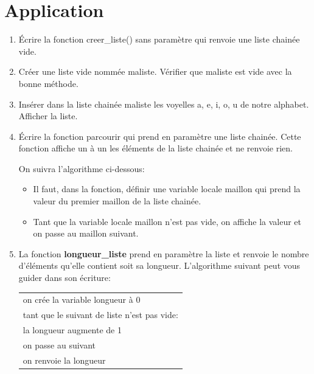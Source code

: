 \documentclass[11pt,a4paper]{article}
\begin{document}
\section{Application}


\begin{enumerate}
\setlength{\itemsep}{6pt}
\item Écrire la fonction \textsf{creer\_liste()} sans paramètre qui renvoie une liste chainée vide.

\item Créer une liste vide nommée \textsf{maliste}. Vérifier que \textsf{maliste} est vide avec la bonne méthode.

\item Insérer dans la liste chainée \textsf{maliste} les voyelles \textsf{a, e, i, o, u} de notre alphabet. Afficher la liste.

\item Écrire la fonction \textsf{parcourir} qui prend en paramètre une liste chainée. Cette fonction affiche un à un les éléments de la liste chainée et ne renvoie rien.

On suivra l'algorithme ci-dessous:
\begin{itemize}
\item Il faut, dans la fonction, définir une variable locale \textsf{maillon} qui prend la valeur du premier maillon de la liste chainée.
\item Tant que la variable locale \textsf{maillon} n'est pas vide, on affiche la valeur et on passe au maillon suivant.
\end{itemize}


\item La fonction \textbf{longueur\_liste} prend en paramètre la liste et renvoie le nombre d'éléments qu'elle contient soit sa longueur. 
L'algorithme suivant peut vous guider dans son écriture:

\begin{center}
\begin{tabular}{|L{10cm}|}\hline
on crée la variable longueur à 0\\
tant que le suivant de liste n'est pas vide: \\
\hspace{1cm} la longueur augmente de 1\\
\hspace{1cm} on passe au suivant\\
on renvoie la longueur\\\hline
\end{tabular}
\end{center}


\end{enumerate}
\end{document}
